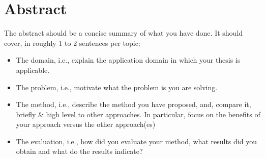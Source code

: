 \chapter*{Abstract}

The abstract should be a concise summary of what you have done.
It should cover, in roughly 1 to 2 sentences per topic:
\begin{itemize}
	\item The domain, i.e., explain the application domain in which your thesis is applicable.
	\item The problem, i.e., motivate what the problem is you are solving.
	\item The method, i.e., describe the method you have proposed, and, compare it, briefly \& high level to other approaches. In particular, focus on the benefits of your approach versus the other approach(es)
	\item The evaluation, i.e., how did you evaluate your method, what results did you obtain  and what do the results indicate?
\end{itemize}
